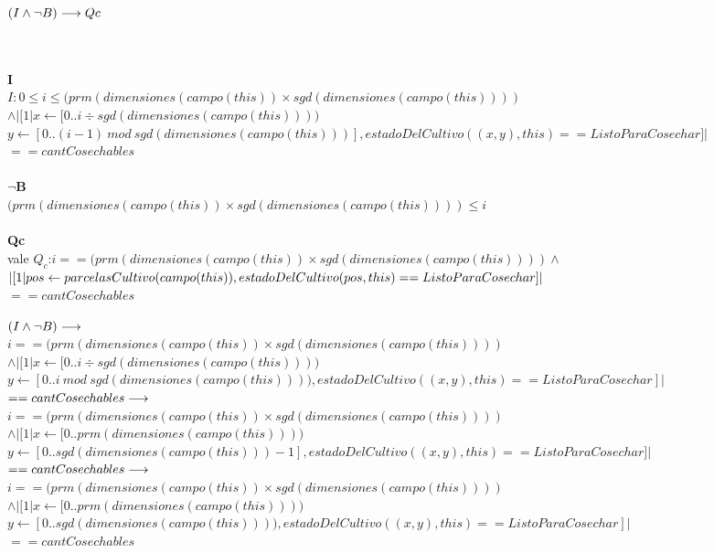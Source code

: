 \documentclass[a4paper]{article}
\begin{document}
\newpage
		\begin{Large}
        {$(I \land \neg B) \longrightarrow Qc$}
        \end{Large}\\
        \\
        \textbf{I}\\
         $ I: 0 \leq i \leq (prm(dimensiones(campo(this)) \times sgd(dimensiones(campo(this)))) $\\ 	$ \land | [1| x \leftarrow [0..i \div sgd(dimensiones(campo(this)))) $\\ $ y \leftarrow 	[0.. (i-1) \ mod \ sgd(dimensiones(campo(this)))], estadoDelCultivo((x,y), this) == ListoParaCosechar]| $\\$ == cantCosechables $ \\   
        \\
        \textbf{$\neg$B}\\
        $(prm(dimensiones(campo(this)) \times sgd(dimensiones(campo(this)))) \leq i$\\
        \\ 
        \textbf{Qc}\\
         vale $Q_c$:$i == (prm(dimensiones(campo(this)) \times sgd(dimensiones(campo(this)))) \land $\\ $ \left| [1| pos \leftarrow parcelasCultivo(campo(this)), estadoDelCultivo(pos, this) == ListoParaCosechar] \right| $\\ $ == cantCosechables $
         
$(I \land \neg B) \longrightarrow$\\
$i == (prm(dimensiones(campo(this)) \times sgd(dimensiones(campo(this)))) $\\$ \land | [1| x \leftarrow [0..i \div sgd(dimensiones(campo(this)))) $\\ $ y \leftarrow 	[0.. i \ mod \ sgd(dimensiones(campo(this)))), estadoDelCultivo((x,y), this) == ListoParaCosechar]| $\\$ == cantCosechables \longrightarrow$\\
$i == (prm(dimensiones(campo(this)) \times sgd(dimensiones(campo(this)))) $\\$ \land | [1| x \leftarrow [0..prm(dimensiones(campo(this)))) $\\ $ y \leftarrow 	[0..sgd(dimensiones(campo(this))) - 1], estadoDelCultivo((x,y), this) == ListoParaCosechar]| $\\$ == cantCosechables \longrightarrow$\\
$ i == (prm(dimensiones(campo(this)) \times sgd(dimensiones(campo(this)))) $\\$ \land | [1| x \leftarrow [0..prm(dimensiones(campo(this)))) $\\ $ y \leftarrow 	[0..sgd(dimensiones(campo(this)))), estadoDelCultivo((x,y), this) == ListoParaCosechar]| $\\$ == cantCosechables $\\
\end{document}
